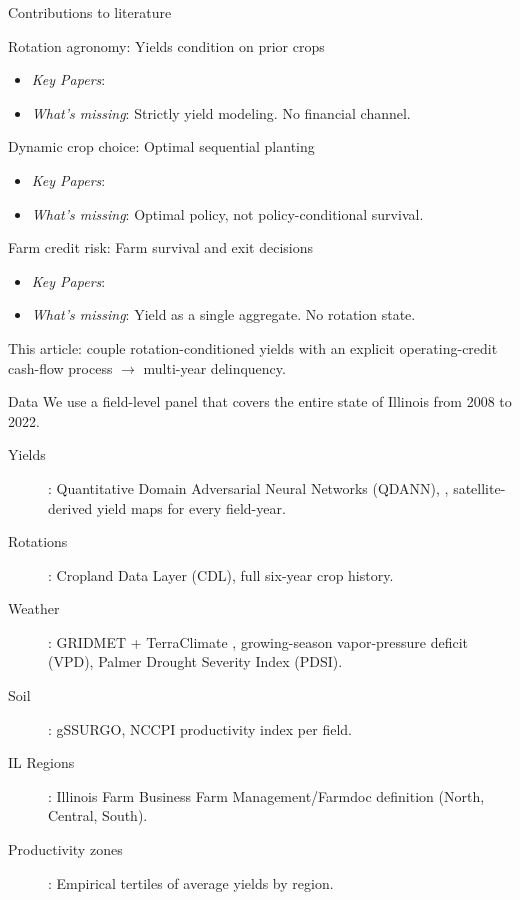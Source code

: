 \documentclass[notes, 10pt, aspectratio=169]{beamer}
\begin{document}
\begin{frame}{Contributions to literature}
\begin{block}{Rotation agronomy: Yields condition on prior crops}
    \begin{itemize}
        \item \textit{Key Papers}: \cite{Bullock1992, Seifert2017}
        \item \textit{What's missing}: Strictly yield modeling. No financial channel.
    \end{itemize}
\end{block}

\begin{block}{Dynamic crop choice: Optimal sequential planting}
    \begin{itemize}
        \item \textit{Key Papers}: \cite{Burt1963, Livingston2015, Chen2025}
        \item \textit{What's missing}: Optimal policy, not policy-conditional survival.
    \end{itemize}
\end{block}

\begin{block}{Farm credit risk: Farm survival and exit decisions}
    \begin{itemize}
        \item \textit{Key Papers}: \cite{Featherstone1988, Ifft2015, Kim2020, Lee2024}
        \item \textit{What's missing}: Yield as a single aggregate. No rotation state.
    \end{itemize}
\end{block}

This article: couple rotation-conditioned yields with an explicit operating-credit cash-flow process $\rightarrow$ multi-year delinquency.
\end{frame}

\begin{frame}{Data}
We use a field-level panel that covers the entire state of Illinois from 2008 to 2022.

\begin{description}
    \item[Yields]: Quantitative Domain Adversarial Neural Networks (QDANN), \cite{Ma2024}, satellite-derived yield maps for every field-year.
    \item[Rotations]: Cropland Data Layer (CDL), full six-year crop history.
    \item[Weather]: GRIDMET \citep{Abatzoglou2013} + TerraClimate \citep{Abatzoglou2018}, growing-season vapor-pressure deficit (VPD), Palmer Drought Severity Index (PDSI).
    \item[Soil]: gSSURGO, NCCPI productivity index per field.
    \item[IL Regions]: Illinois Farm Business Farm Management/Farmdoc definition (North, Central, South).
    \item[Productivity zones]: Empirical tertiles of average yields by region.
\end{description}
\end{frame}
\end{document}
